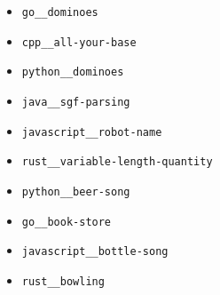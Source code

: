 \begin{multicols}{2}
\begin{itemize}
    \item \texttt{go\_\_dominoes}
    \item \texttt{cpp\_\_all-your-base}
    \item \texttt{python\_\_dominoes}
    \item \texttt{java\_\_sgf-parsing}
    \item \texttt{javascript\_\_robot-name}
    \item \texttt{rust\_\_variable-length-quantity}
    \item \texttt{python\_\_beer-song}
    \item \texttt{go\_\_book-store}
    \item \texttt{javascript\_\_bottle-song}
    \item \texttt{rust\_\_bowling}
\end{itemize}
\end{multicols}